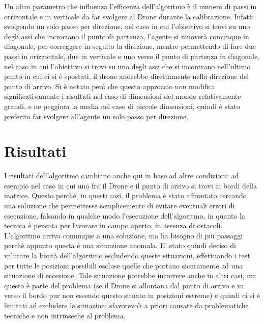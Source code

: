 Un altro parametro che influenza l'efficenza dell'algoritmo è il numero di passi in orrizontale e in verticale da far svolgere al Drone durante la calibrazione. Infatti svolgendo un solo passo per direzione, nel caso in cui l'obiettivo si trovi su uno degli assi che incrociano il punto di partenza, l'agente si muoverà comunque in diagonale, per correggere in seguito la direzione, mentre permettendo di fare due passi in orizzontale, due in verticale e uno verso il punto di partenza in diagonale, nel caso in cui l'obiettivo si trovi su uno degli assi che si incontrano nell'ultimo punto in cui ci si è spostati, il drone andrebbe direttamente nella direzione del punto di arrivo. Si è notato però che questo approccio non modifica significativamente i risultati nel caso di dimensioni del mondo relativamente grandi, e ne peggiora la media nel caso di piccole dimensioni, quindi è stato preferito far svolgere all'agente un solo passo per direzione.
	
\section{Risultati}
I risultati dell'algoritmo cambiano anche qui in base ad altre condizioni: ad esempio nel caso in cui uno fra il Drone e il punto di arrivo si trovi ai bordi della matrice. Questo perchè, in questi casi, il problema è stato affrontato cercando una soluzione che permettesse semplicemente di evitare eventuali errori di esecuzione, falsando in qualche modo l'esecuzione dell'algoritmo, in quanto la tecnica è pensata per lavorare in campo aperto, in assenza di ostacoli. L'algoritmo arriva comunque a una soluzione, ma ha bisogno di più passaggi perchè appunto questa è una situazione anomala. E' stato quindi deciso di valutare la bontà dell'algoritmo escludendo queste situazioni, effettuando i test per tutte le posizioni possibili escluse quelle che portano sicuramente ad una situazione di eccezione. Tale situazione potrebbe incorrere anche in altri casi, ma questo è parte del problema (se il Drone si allontana dal punto di arrivo e va verso il bordo pur non essendo questo situato in posizioni estreme) e quindi ci si è limitati ad escludere le situazioni sfavorevoli a priori causate da problematiche tecniche e non intrinseche al problema.


